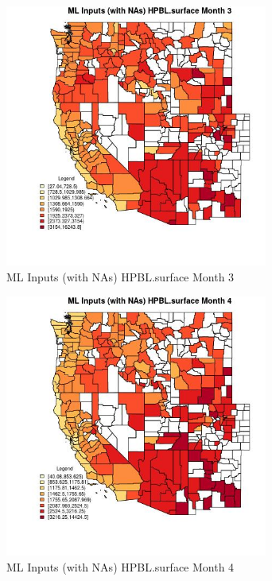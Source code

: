 \begin{figure} 
\centering  
\includegraphics[width=0.77\textwidth]{Code_Outputs/Report_ML_input_PM25_Step4_part_e_de_duplicated_aves_compiled_2019-05-21wNAs_CountyHPBLsurfacemedianMonth3.jpg} 
\caption{\label{fig:Report_ML_input_PM25_Step4_part_e_de_duplicated_aves_compiled_2019-05-21wNAsCountyHPBLsurfacemedianMonth3}ML Inputs (with NAs) HPBL.surface Month 3} 
\end{figure} 
 

\begin{figure} 
\centering  
\includegraphics[width=0.77\textwidth]{Code_Outputs/Report_ML_input_PM25_Step4_part_e_de_duplicated_aves_compiled_2019-05-21wNAs_CountyHPBLsurfacemedianMonth4.jpg} 
\caption{\label{fig:Report_ML_input_PM25_Step4_part_e_de_duplicated_aves_compiled_2019-05-21wNAsCountyHPBLsurfacemedianMonth4}ML Inputs (with NAs) HPBL.surface Month 4} 
\end{figure} 
 

